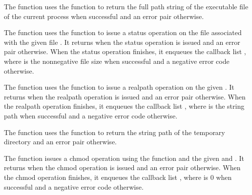 The  function uses the
 function to return the full path string of the
executable file of the current process when successful and an error
pair otherwise.

\begin{function}
\end{function}

The  function uses the 
function to issue a status operation on the file associated with the
given file . It returns  when the status operation
is issued and an error pair otherwise. When the status operation
finishes, it enqueues the callback list , where  is the nonnegative file size when
successful and a negative error code otherwise.

\begin{function}
\end{function}

The  function uses the
 function to issue a realpath operation on the
given . It returns  when the realpath operation is
issued and an error pair otherwise. When the realpath operation
finishes, it enqueues the callback list , where  is the string path when
successful and a negative error code otherwise.

\begin{function}
\end{function}

The  function uses the
 function to return the string path of the
temporary directory and an error pair otherwise.

\begin{function}
\end{function}

The  function issues a chmod operation using the
 function and the given  and
. It returns  when the chmod operation is issued
and an error pair otherwise. When the chmod operation finishes, it
enqueues the callback list , where
 is 0 when successful and a negative error code otherwise.

